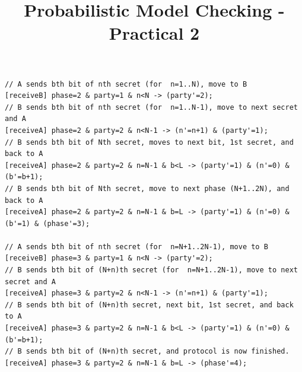 \documentclass[12pt]{article}
\title{Probabilistic Model Checking - Practical 2}
\date{}
\begin{document}
\maketitle

\section {}
\begin{lstlisting}[caption=EGL3 Changes]
// A sends bth bit of nth secret (for  n=1..N), move to B
[receiveB] phase=2 & party=1 & n<N -> (party'=2);
// B sends bth bit of nth secret (for  n=1..N-1), move to next secret and A
[receiveA] phase=2 & party=2 & n<N-1 -> (n'=n+1) & (party'=1);
// B sends bth bit of Nth secret, moves to next bit, 1st secret, and back to A
[receiveA] phase=2 & party=2 & n=N-1 & b<L -> (party'=1) & (n'=0) & (b'=b+1);
// B sends bth bit of Nth secret, move to next phase (N+1..2N), and back to A
[receiveA] phase=2 & party=2 & n=N-1 & b=L -> (party'=1) & (n'=0) & (b'=1) & (phase'=3);

// A sends bth bit of nth secret (for  n=N+1..2N-1), move to B
[receiveB] phase=3 & party=1 & n<N -> (party'=2);
// B sends bth bit of (N+n)th secret (for  n=N+1..2N-1), move to next secret and A
[receiveA] phase=3 & party=2 & n<N-1 -> (n'=n+1) & (party'=1);
// B sends bth bit of (N+n)th secret, next bit, 1st secret, and back to A
[receiveA] phase=3 & party=2 & n=N-1 & b<L -> (party'=1) & (n'=0) & (b'=b+1);
// B sends bth bit of (N+n)th secret, and protocol is now finished.
[receiveA] phase=3 & party=2 & n=N-1 & b=L -> (phase'=4);
\end{lstlisting}

\clearpage
\end{document}
